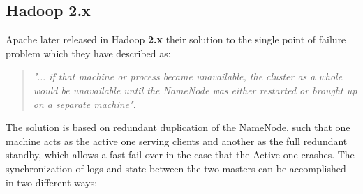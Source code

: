 \subsection*{Hadoop 2.x}
Apache later released in Hadoop \textbf{2.x} \cite{Hadoop2xDocumentation} their solution to the single point of failure problem which they have described as: 

\begin{quotation}
	\textit{"$\ldots$ if that machine or process became unavailable, the cluster as a whole would be unavailable until the NameNode was either restarted or brought up on a separate machine"}. 
\end{quotation}

The solution is based on redundant duplication of the NameNode, such that one machine acts as the active one serving clients and another as the full redundant standby, which allows a fast fail-over in the case that the Active one crashes. The synchronization of logs and state between the two masters can be accomplished in two different ways:
\vspace*{3mm}

